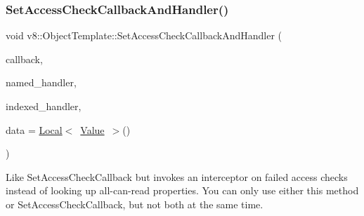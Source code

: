 \subsubsection{\texorpdfstring{Set\+Access\+Check\+Callback\+And\+Handler()}{SetAccessCheckCallbackAndHandler()}}
{\footnotesize\ttfamily void v8\+::\+Object\+Template\+::\+Set\+Access\+Check\+Callback\+And\+Handler (\begin{DoxyParamCaption}\item[{\mbox{\hyperlink{namespacev8_a1024fb358d107c1494163217830688e6}{Access\+Check\+Callback}}}]{callback,  }\item[{const \mbox{\hyperlink{structv8_1_1NamedPropertyHandlerConfiguration}{Named\+Property\+Handler\+Configuration}} \&}]{named\+\_\+handler,  }\item[{const \mbox{\hyperlink{structv8_1_1IndexedPropertyHandlerConfiguration}{Indexed\+Property\+Handler\+Configuration}} \&}]{indexed\+\_\+handler,  }\item[{\mbox{\hyperlink{classv8_1_1Local}{Local}}$<$ \mbox{\hyperlink{classv8_1_1Value}{Value}} $>$}]{data = {\ttfamily \mbox{\hyperlink{classv8_1_1Local}{Local}}$<$~\mbox{\hyperlink{classv8_1_1Value}{Value}}~$>$()} }\end{DoxyParamCaption})}

Like Set\+Access\+Check\+Callback but invokes an interceptor on failed access checks instead of looking up all-\/can-\/read properties. You can only use either this method or Set\+Access\+Check\+Callback, but not both at the same time. \mbox{\label{classv8_1_1ObjectTemplate_a5a99dc7b4895ad486430a4ba6c294136}} 
